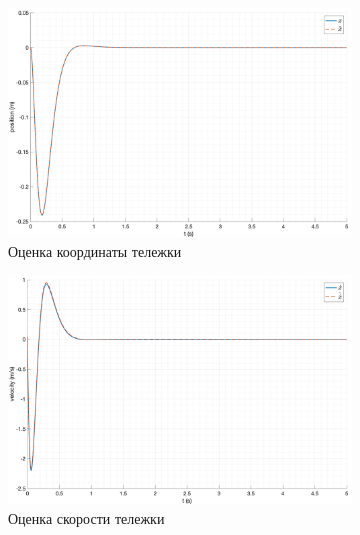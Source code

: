 \begin{figure}[ht!]
    \centering
    \begin{subfigure}[b]{0.45\textwidth}
        \includegraphics[width=\textwidth]{media/plots/reduced_observer/reduced_observer_x_cmp_2.png}
        \caption{Оценка координаты тележки}
        \label{fig:reduced_observer_x_cmp_2}
    \end{subfigure}
    \begin{subfigure}[b]{0.45\textwidth}
        \includegraphics[width=\textwidth]{media/plots/reduced_observer/reduced_observer_dotx_cmp_2.png}
        \caption{Оценка скорости тележки}
        \label{fig:reduced_observer_dotx_cmp_2}
    \end{subfigure}
    \begin{subfigure}[b]{0.45\textwidth}

\end{subfigure}
\end{figure}

